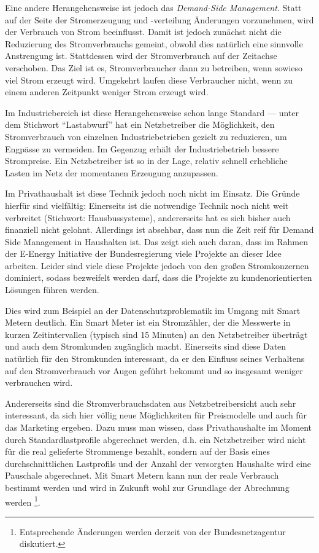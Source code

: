 \documentclass[12pt,BCOR=8.5mm]{scrartcl}
\begin{document}
Eine andere Herangehensweise ist jedoch das \emph{Demand-Side
Management}. Statt auf der Seite der Stromerzeugung und -verteilung
Änderungen vorzunehmen, wird der Verbrauch von Strom beeinflusst. Damit
ist jedoch zunächst nicht die Reduzierung des Stromverbrauchs gemeint,
obwohl dies natürlich eine sinnvolle Anstrengung ist. Stattdessen wird
der Stromverbrauch auf der Zeitachse verschoben. Das Ziel ist es,
Stromverbraucher dann zu betreiben, wenn sowieso viel Strom erzeugt
wird. Umgekehrt laufen diese Verbraucher nicht, wenn zu einem anderen
Zeitpunkt weniger Strom erzeugt wird.

Im Industriebereich ist diese Herangehensweise schon lange Standard ---
unter dem Stichwort "`Lastabwurf"' hat ein Netzbetreiber die
Möglichkeit, den Stromverbrauch von einzelnen Industriebetrieben gezielt
zu reduzieren, um Engpässe zu vermeiden. Im Gegenzug erhält der
Industriebetrieb bessere Strompreise. Ein Netzbetreiber ist so in der
Lage, relativ schnell erhebliche Lasten im Netz der momentanen Erzeugung
anzupassen.

Im Privathaushalt ist diese Technik jedoch noch nicht im Einsatz. Die
Gründe hierfür sind vielfältig: Einerseits ist die notwendige Technik
noch nicht weit verbreitet (Stichwort: Hausbussysteme), andererseits hat
es sich bisher auch finanziell nicht gelohnt. Allerdings ist absehbar,
dass nun die Zeit reif für Demand Side Management in Haushalten ist. Das
zeigt sich auch daran, dass im Rahmen der E-Energy Initiative der
Bundesregierung viele Projekte an dieser Idee arbeiten. Leider sind viele diese Projekte jedoch von den großen
Stromkonzernen dominiert, sodass bezweifelt werden darf, dass die
Projekte zu kundenorientierten Lösungen führen werden. 

Dies wird zum Beispiel an der Datenschutzproblematik im Umgang mit Smart
Metern deutlich. Ein Smart Meter ist ein Stromzähler, der die Messwerte
in kurzen Zeitintervallen (typisch sind 15 Minuten) an den Netzbetreiber
überträgt und auch dem Stromkunden zugänglich macht. Einerseits sind
diese Daten natürlich für den Stromkunden interessant, da er den
Einfluss seines Verhaltens auf den Stromverbrauch vor Augen geführt
bekommt und so insgesamt weniger verbrauchen wird.

Andererseits sind die Stromverbrauchsdaten aus Netzbetreibersicht auch
sehr interessant, da sich hier völlig neue Möglichkeiten für
Preismodelle und auch für das Marketing ergeben. Dazu muss man wissen,
dass Privathaushalte im Moment durch Standardlastprofile abgerechnet
werden, d.h. ein Netzbetreiber wird nicht für die real gelieferte
Strommenge bezahlt, sondern auf der Basis eines durchschnittlichen
Lastprofils und der Anzahl der versorgten Haushalte wird eine Pauschale
abgerechnet. Mit Smart Metern kann nun der reale Verbrauch bestimmt
werden und wird in Zukunft wohl zur Grundlage der Abrechnung werden
\footnote{Entsprechende Änderungen werden derzeit von der
Bundesnetzagentur diskutiert.}. 
\end{document}

